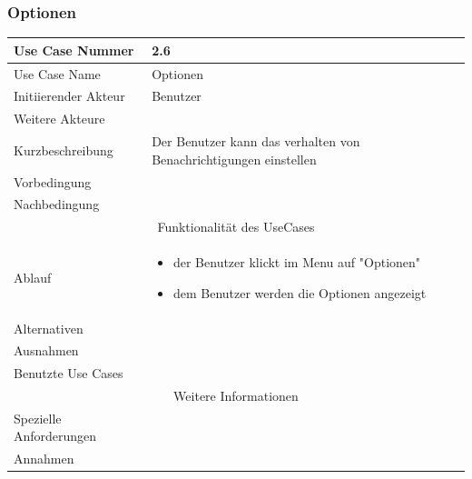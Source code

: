 \documentclass[10pt,a4paper]{article}
\begin{document}
\subsubsection{Optionen}
		\begin{tabular}{|l|p{.5\linewidth}|}
		\hline Use Case Nummer & 2.6 \\ 
		\hline Use Case Name & Optionen \\ 
		\hline Initiierender Akteur & Benutzer \\
		\hline Weitere Akteure &  \\
		\hline Kurzbeschreibung & Der Benutzer kann das verhalten von Benachrichtigungen einstellen \\
		\hline Vorbedingung &  \\
		\hline Nachbedingung &  \\
		\hline \multicolumn{2}{|c|}{Funktionalität des UseCases}\\
		\hline Ablauf & \begin{itemize}
			\item der Benutzer klickt im Menu auf "Optionen"
			\item dem Benutzer werden die Optionen angezeigt
		\end{itemize} \\
		\hline Alternativen &  \\
		\hline Ausnahmen &  \\
		\hline Benutzte Use Cases &  \\
		\hline \multicolumn{2}{|c|}{Weitere Informationen} \\
		\hline Spezielle Anforderungen &  \\
		\hline Annahmen &  \\
		\hline
		\end{tabular}
\end{document}
